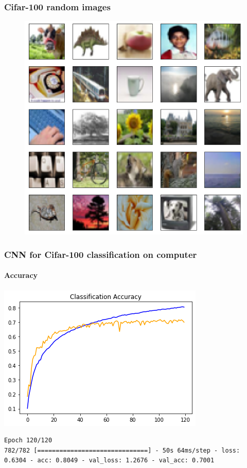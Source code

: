 \documentclass{beamer}
\begin{document}
\begin{frame}[fragile]
\frametitle{Cifar-100 random images}
\begin{figure}
	\centering
	\includegraphics[scale=0.35]{pictures/index_Cifar-100}
\end{figure}
\end{frame}

\begin{frame}[fragile]
\frametitle{CNN for Cifar-100 classification on computer}
\framesubtitle{Accuracy}
\centering
\includegraphics[scale=0.5]{pictures/Accuracy_plot_Cifar100_Keras}
\begin{lstlisting}
Epoch 120/120
782/782 [==============================] - 50s 64ms/step - loss: 0.6304 - acc: 0.8049 - val_loss: 1.2676 - val_acc: 0.7001
\end{lstlisting}
\end{frame}
\end{document}
